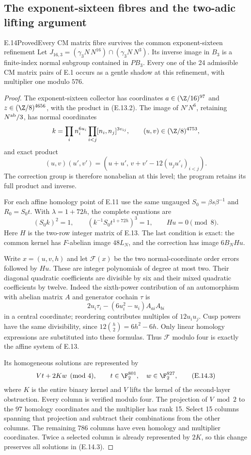 \subsection{The exponent-sixteen fibres and the two-adic lifting argument}

\begin{statement}{E.14}{Proved}{Every CM matrix fibre survives the common exponent-sixteen refinement}
Let $J_{16,3}=(\gamma_3N\,N^{16})\cap(\gamma_3N\,N^3)$.
Its inverse image in $B_3$ is a finite-index normal subgroup
contained in $PB_3$. Every one of the 24 admissible CM matrix
pairs of E.1 occurs as a gentle shadow at this refinement,
with multiplier one modulo $576$.
\end{statement}
\begin{proof}
The exponent-sixteen collector has coordinates
$a\in(\Z/16)^{97}$ and $z\in(\Z/8)^{4656}$, with the product
in (E.13.2). The image of $N'N^6$, retaining $N^{\rm ab}/3$,
has normal coordinates
\[
 k=\prod_i n_i^{6u_i}\prod_{i<j}[n_i,n_j]^{3v_{ij}},
 \qquad (u,v)\in(\Z/8)^{4753},
\]
and exact product
\[
 (u,v)(u',v')=(u+u',\,v+v'-12(u_ju'_i)_{i<j}).
 \tag{E.14.1}
\]
The correction group is therefore nonabelian at this level;
the program retains its full product and inverse.

For each affine homology point of E.11 use the same ungauged
$S_0=\beta s\beta^{-1}$ and $R_0=S_0t$. With $\lambda=1+72h$,
the complete equations are
\[
 (S_0k)^2=1,\qquad
 (k^{-1}S_0t^{1+72h})^3=1,\qquad Hu=0\pmod8.
 \tag{E.14.2}
\]
Here $H$ is the two-row integer matrix of E.13.
The last condition is exact: the common kernel has
$F$-abelian image $48L_N$, and the correction has image
$6B_NHu$.

Write $x=(u,v,h)$ and let $\mathcal F(x)$ be the two
normal-coordinate order errors followed by $Hu$.
These are integer polynomials of degree at most two.
Their diagonal quadratic coefficients are divisible by six
and their mixed quadratic coefficients by twelve.
Indeed the sixth-power contribution of an automorphism
with abelian matrix $A$ and generator cochain $\tau$ is
\[
 2u_i\tau_i-(6u_i^2-u_i)A_{ai}A_{bi}
\]
in a central coordinate; reordering contributes multiples
of $12u_i u_j$. Cusp powers have the same divisibility,
since $12\binom h2=6h^2-6h$. Only linear homology
expressions are substituted into these formulas.
Thus $\mathcal F$ modulo four is exactly the affine system
of E.13.

Its homogeneous solutions are represented by
\[
 Vt+2Kw\pmod4,
 \qquad t\in\F_2^{801},\quad w\in\F_2^{827},
 \tag{E.14.3}
\]
where $K$ is the entire binary kernel and $V$ lifts the
kernel of the second-layer obstruction. Every column is
verified modulo four. The projection of $V\bmod2$ to
the 97 homology coordinates and the multiplier has rank
15. Select 15 columns spanning that projection and subtract
their combinations from the other columns. The remaining
786 columns have even homology and multiplier coordinates.
Twice a selected column is already represented by $2K$,
so this change preserves all solutions in (E.14.3).


\end{proof}
